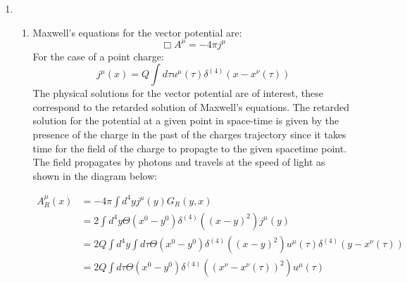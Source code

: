 \documentclass[12pt,a4]{article}
\begin{document}
\begin{enumerate}
  \item
    \begin{enumerate}
      \item
        Maxwell's equations for the vector potential are:
        \begin{equation*}
          \Box A^\mu = - 4 \pi j^\mu
        \end{equation*}
        For the case of a point charge:
        \begin{equation*}
          j^\mu(x) = Q \int d\tau u^\mu(\tau) \delta^{(4)} (x - x^{\nu}(\tau))
        \end{equation*}
        The physical solutions for the vector potential are of interest, these correspond to the retarded solution of Maxwell's equations. 
        The retarded solution for the potential at a given point in space-time is given by the presence of the charge in the past of the charges trajectory since it takes time for the field of the charge to propagte to the given spacetime point.
        The field propagates by photons and travels at the speed of light as shown in the diagram below:
        \begin{figure}[H]
          \centering
        \end{figure}
        \begin{align*}
          A^\mu_R(x) &= -4\pi \int d^4 y j^\mu (y) G_R(y,x)\\
                     &= 2 \int d^4 y \Theta(x^{0} - y^{0})\delta^{(4)}\left((x - y)^2\right)j^\mu (y) \\
                     &= 2 Q\int d^4 y \int d\tau \Theta(x^{0} - y^{0})\delta^{(4)}\left((x - y)^2\right)   u^\mu(\tau) \delta^{(4)} (y - x^{\nu}(\tau))\\
                     &= 2 Q \int d\tau \Theta(x^{0} - y^{0})\delta^{(4)}\left((x^\nu - x^{\nu}(\tau))^2\right) u^\mu(\tau)
        \end{align*}

\end{enumerate}
\end{enumerate}
\end{document}
